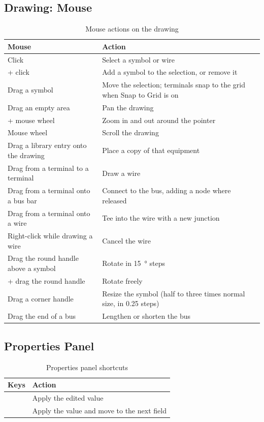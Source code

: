 \subsection{Drawing: Mouse}

\begin{table}[H]
  \centering
  \caption{Mouse actions on the drawing}
  \label{tab:keys-mouse}
  \begin{tabularx}{\textwidth}{l L}
    \toprule
    \textbf{Mouse} & \textbf{Action} \\
    \midrule
    Click & Select a symbol or wire \\
     + click & Add a symbol to the selection, or remove it \\
    Drag a symbol & Move the selection; terminals snap to the grid when Snap to Grid is on \\
    Drag an empty area & Pan the drawing \\
     + mouse wheel & Zoom in and out around the pointer \\
    Mouse wheel & Scroll the drawing \\
    Drag a library entry onto the drawing & Place a copy of that equipment \\
    Drag from a terminal to a terminal & Draw a wire \\
    Drag from a terminal onto a bus bar & Connect to the bus, adding a node where released \\
    Drag from a terminal onto a wire & Tee into the wire with a new junction \\
    Right-click while drawing a wire & Cancel the wire \\
    Drag the round handle above a symbol & Rotate in \SI{15}{\degree} steps \\
     + drag the round handle & Rotate freely \\
    Drag a corner handle & Resize the symbol (half to three times normal size, in 0.25 steps) \\
    Drag the end of a bus & Lengthen or shorten the bus \\
    \bottomrule
  \end{tabularx}
\end{table}

\subsection{Properties Panel}

\begin{table}[H]
  \centering
  \caption{Properties panel shortcuts}
  \label{tab:keys-properties}
  \begin{tabularx}{\textwidth}{l L}
    \toprule
    \textbf{Keys} & \textbf{Action} \\
    \midrule
     & Apply the edited value \\
     & Apply the value and move to the next field \\
    \bottomrule
  \end{tabularx}
\end{table}

